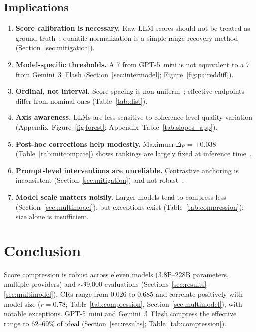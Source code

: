 \documentclass[11pt]{article}
\begin{document}
\subsection{Implications}
\begin{enumerate}
    \item \textbf{Score calibration is necessary.} Raw LLM scores should
    not be treated as ground truth~\citep{liu2023geval,zheng2023judging};
    quantile normalization is a simple range-recovery method~\citep{bolstad2003comparison}
    (Section~\ref{sec:mitigation}).
    \item \textbf{Model-specific thresholds.} A 7 from GPT-5~mini is not
    equivalent to a 7 from Gemini~3~Flash (Section~\ref{sec:intermodel};
    Figure~\ref{fig:paireddiff}).
    \item \textbf{Ordinal, not interval.} Score spacing is non-uniform~\citep{stevens1971issues};
    effective endpoints differ from nominal ones (Table~\ref{tab:dist}).
    \item \textbf{Axis awareness.} LLMs are less sensitive to
    coherence-level quality variation (Appendix~Figure~\ref{fig:forest};
    Appendix~Table~\ref{tab:slopes_app}).
    \item \textbf{Post-hoc corrections help modestly.} Maximum
    $\Delta\rho=+0.038$ (Table~\ref{tab:mitcompare}) shows rankings are
    largely fixed at inference time~\citep{rafailov2023direct}.
    \item \textbf{Prompt-level interventions are unreliable.}
    Contrastive anchoring is inconsistent (Section~\ref{sec:mitigation})
    and not robust~\citep{rafailov2023direct}.
    \item \textbf{Model scale matters noisily.} Larger models tend to
    compress less (Section~\ref{sec:multimodel}), but exceptions exist
    (Table~\ref{tab:compression}); size alone is insufficient.
\end{enumerate}

\section{Conclusion}
\label{sec:conclusion}

Score compression is robust across eleven models (3.8B--228B parameters,
multiple providers) and $\sim$99{,}000 evaluations
(Sections~\ref{sec:results}--\ref{sec:multimodel}). CRs range from 0.026
to 0.685 and correlate positively with model size ($r=0.78$;
Table~\ref{tab:compression}, Section~\ref{sec:multimodel}), with notable
exceptions. GPT-5~mini and Gemini~3~Flash compress the effective range to
62--69\% of ideal (Section~\ref{sec:results}; Table~\ref{tab:compression}).
\end{document}
